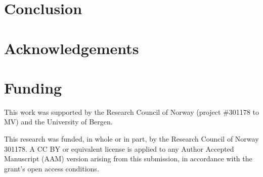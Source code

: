 \documentclass{bioinfo}
\begin{document}
\section{Conclusion}





\section*{Acknowledgements}


\section*{Funding}

This work was supported by the Research Council of Norway (project \#301178 to MV) and the University of Bergen.

This research was funded, in whole or in part, by the Research Council of Norway 301178. A CC BY or equivalent license is applied to any Author Accepted Manuscript (AAM) version arising from this submission, in accordance with the grant’s open access conditions.

%
%
%
%
%
%
%
%
%
\end{document}
